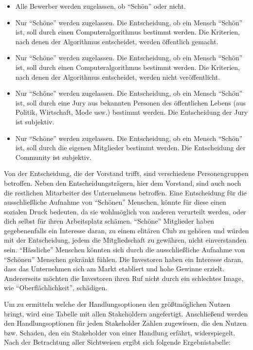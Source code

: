 \begin{itemize}
\item Alle Bewerber werden zugelassen, ob ``Schön'' oder nicht.
\item Nur ``Schöne'' werden zugelassen. Die Entscheidung, ob ein Mensch ``Schön'' ist, soll durch einen Computeralgorithmus bestimmt werden. Die Kriterien, nach denen der Algorithmus entscheidet, werden öffentlich gemacht.
\item Nur ``Schöne'' werden zugelassen. Die Entscheidung, ob ein Mensch ``Schön'' ist, soll durch einen Computeralgorithmus bestimmt werden. Die Kriterien, nach denen der Algorithmus entscheidet, werden nicht veröffentlicht.
\item Nur ``Schöne'' werden zugelassen. Die Entscheidung, ob ein Mensch ``Schön'' ist, soll durch eine Jury aus bekannten Personen des öffentlichen Lebens (aus Politik, Wirtschaft, Mode usw.) bestimmt werden. Die Entscheidung der Jury ist subjektiv.
\item Nur ``Schöne'' werden zugelassen. Die Entscheidung, ob ein Mensch ``Schön'' ist, soll durch die eigenen Mitglieder bestimmt werden. Die Entscheidung der Community ist subjektiv.
\end{itemize}
Von der Entscheidung, die der Vorstand trifft, sind verschiedene Personengruppen betroffen. Neben den Entscheidungsträgern, hier dem Vorstand, sind auch noch die restlichen Mitarbeiter des Unternehmens betroffen. Eine Entscheidung für die ausschließliche Aufnahme von ``Schönen'' Menschen, könnte für diese einen sozialen Druck bedeuten, da sie wohlmöglich von anderen verurteilt werden, oder dich selbst für ihren Arbeitsplatz schämen. ``Schöne'' Mitglieder haben gegebenenfalls ein Interesse daran, zu einem elitären Club zu gehören und würden mit der Entscheidung, jedem die Mitgliedschaft zu gewähren, nicht einverstanden sein. ``Hässliche'' Menschen könnten sich durch die ausschließliche Aufnahme von ``Schönen'' Menschen gekränkt fühlen. Die Investoren haben ein Interesse daran, dass das Unternehmen sich am Markt etabliert und hohe Gewinne erzielt. Andererseits möchten die Investoren ihren Ruf nicht durch ein schlechtes Image, wie ``Oberflächlichkeit'', schädigen.

Um zu ermitteln welche der Handlungsoptionen den größtmöglichen Nutzen bringt, wird eine Tabelle mit allen Stakeholdern angefertigt. Anschließend werden den Handlungsoptionen
für jeden Stakeholder Zahlen zugewiesen, die den Nutzen bzw. Schaden, den ein Stakeholder von einer Handlung erfährt, widerspiegelt. Nach der Betrachtung aller Sichtweisen ergibt sich folgende Ergebnistabelle:





